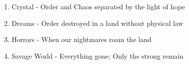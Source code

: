 \begin{enumerate}
\begin{enumerate}
		\begin{enumerate}
		\item Crystal - Order and Chaos separated by the light of hope
		\item Dreams - Order destroyed in a land without physical law
		\item Horrors - When our nightmares roam the land
		\item Savage World - Everything gone; Only the strong remain
		\end{enumerate}
	\end{enumerate}
\end{enumerate}

\appendix
